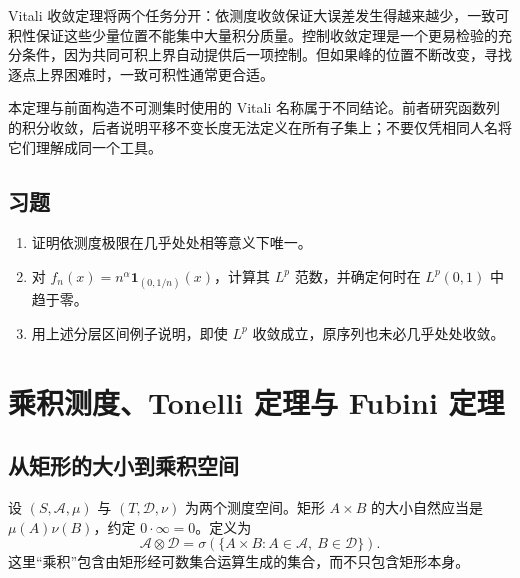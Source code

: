 \documentclass[UTF8,12pt,a4paper,fontset=fandol]{ctexbook}
\begin{document}
Vitali 收敛定理将两个任务分开：依测度收敛保证大误差发生得越来越少，一致可积性保证这些少量位置不能集中大量积分质量。控制收敛定理是一个更易检验的充分条件，因为共同可积上界自动提供后一项控制。但如果峰的位置不断改变，寻找逐点上界困难时，一致可积性通常更合适。

本定理与前面构造不可测集时使用的 Vitali 名称属于不同结论。前者研究函数列的积分收敛，后者说明平移不变长度无法定义在所有子集上；不要仅凭相同人名将它们理解成同一个工具。

\section{习题}
\begin{enumerate}
 \item 证明依测度极限在几乎处处相等意义下唯一。
 \item 对 $f_n(x)=n^\alpha\mathbf1_{(0,1/n)}(x)$，计算其 $L^p$ 范数，并确定何时在 $L^p(0,1)$ 中趋于零。
 \item 用上述分层区间例子说明，即使 $L^p$ 收敛成立，原序列也未必几乎处处收敛。
\end{enumerate}

\chapter{乘积测度、Tonelli 定理与 Fubini 定理}
\label{chap:mt-product}

\section{从矩形的大小到乘积空间}
设 $(S,\mathcal A,\mu)$ 与 $(T,\mathcal D,\nu)$ 为两个测度空间。矩形 $A\times B$ 的大小自然应当是 $\mu(A)\nu(B)$，约定 $0\cdot\infty=0$。定义为
\[
 \mathcal A\otimes\mathcal D
 =\sigma(\{A\times B:A\in\mathcal A,\ B\in\mathcal D\}).
\]
这里“乘积”包含由矩形经可数集合运算生成的集合，而不只包含矩形本身。
\end{document}
